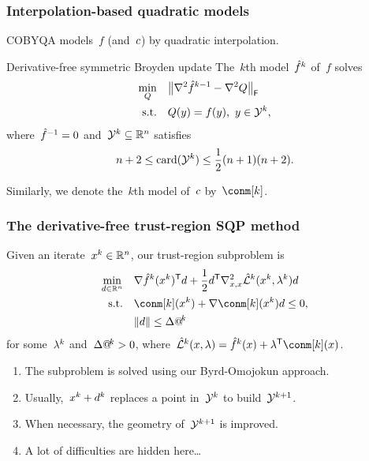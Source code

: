 \documentclass{polyu-presentation}
\makeatletter
\newcommand{\con}[1][]{c\ifthenelse{\equal{#1}{}}{}{_{#1}}}
\newcommand{\iter}[1][]{x\ifthenelse{\equal{#1}{}}{}{^{#1}}}
\newcommand{\lagm}[1][]{\hat{\mathcal{L}}\ifthenelse{\equal{#1}{}}{}{^{#1}}}
\newcommand{\lm}[1][]{\lambda\ifthenelse{\equal{#1}{}}{}{^{#1}}}
\newcommand{\obj}{f}
\newcommand{\objm}[1][]{\hat{f}\ifthenelse{\equal{#1}{}}{}{^{#1}}}
\newcommand{\rad}[1][]{\Delta\ifthenelse{\equal{#1}{}}{}{@\!^{#1}}}
\newcommand{\step}[1][]{d\ifthenelse{\equal{#1}{}}{}{^{#1}}}
\newcommand{\xpt}[1][]{\mathcal{Y}\ifthenelse{\equal{#1}{}}{}{^{#1}}}
\makeatother
\begin{document}
\begin{frame}
    \frametitle{Interpolation-based quadratic models}
    
	COBYQA models~$\obj$ (and~$\con$) by \alert{quadratic} interpolation.

    \medskip

    \begin{block}{Derivative-free symmetric Broyden update}
        The~$k$th model~$\objm[k]$ of~$\obj$ solves
        \begin{align*}
            \min_{Q}    & \quad \norm[\big]{\nabla^2 \objm[k - 1] - \nabla^2 Q}_{\mathsf{F}}\\
            \text{s.t.} & \quad Q(y) = \obj(y), ~ y \in \xpt[k],
        \end{align*}
        where~$\objm[-1] = 0$ and~$\xpt[k] \subseteq \R^n$ satisfies
        \begin{equation*}
            n + 2 \le \card(\xpt[k]) \le \frac{1}{2} (n + 1) (n + 2).
        \end{equation*}
    \end{block}

    \medskip

    Similarly, we denote the~$k$th model of~$\con$ by~$\conm[k]$.
\end{frame}

\begin{frame}
    \frametitle{The derivative-free trust-region SQP method}

    Given an iterate~$\iter[k] \in \R^n$, our \alert{trust-region} subproblem is
    \begin{align*}
        \min_{\step \in \R^n}   & \quad \nabla \objm[k](\iter[k])^{\T} \step + \frac{1}{2} \step^{\T} \nabla_{x, x}^2 \lagm[k](\iter[k], \lm[k]) \step\\
        \text{s.t.}             & \quad \conm[k](\iter[k]) + \nabla \conm[k](\iter[k]) \step \le 0,\\
                                & \quad \norm{\step} \le \rad[k]
    \end{align*}
    for some~$\lm[k]$ and~$\rad[k] > 0$, where~$\lagm[k](\iter, \lm) = \objm[k](\iter) + \lm^{\T} \conm[k](\iter)$.

    \medskip

    \begin{block}{}
        \begin{enumerate}
            \item The subproblem is solved using our \alert{Byrd-Omojokun} approach.
            \item Usually,~$\iter[k] + \step[k]$ replaces a point in~$\xpt[k]$ to build~$\xpt[k + 1]$.
            \item When necessary, the \alert{geometry} of~$\xpt[k + 1]$ is improved.
            \item A lot of \alert{difficulties} are hidden here\dots
        \end{enumerate}
    \end{block}
\end{frame}
\end{document}
